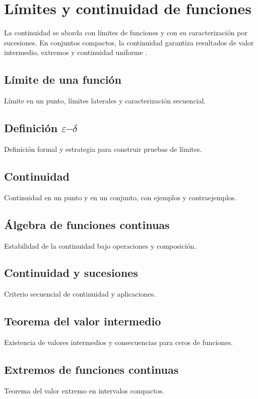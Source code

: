 \chapter{Límites y continuidad de funciones}
\label{cap:continuidad-compacidad}

La continuidad se aborda con límites de funciones y con su caracterización por sucesiones. En conjuntos compactos, la continuidad garantiza resultados de valor intermedio, extremos y continuidad uniforme \cite{abbott2015,spivak2008,rudin1976}.

\section{Límite de una función}
Límite en un punto, límites laterales y caracterización secuencial.

\section{Definición \texorpdfstring{$\varepsilon$--$\delta$}{epsilon--delta}}
Definición formal y estrategia para construir pruebas de límites.

\section{Continuidad}
Continuidad en un punto y en un conjunto, con ejemplos y contraejemplos.

\section{Álgebra de funciones continuas}
Estabilidad de la continuidad bajo operaciones y composición.

\section{Continuidad y sucesiones}
Criterio secuencial de continuidad y aplicaciones.

\section{Teorema del valor intermedio}
Existencia de valores intermedios y consecuencias para ceros de funciones.

\section{Extremos de funciones continuas}
Teorema del valor extremo en intervalos compactos.

